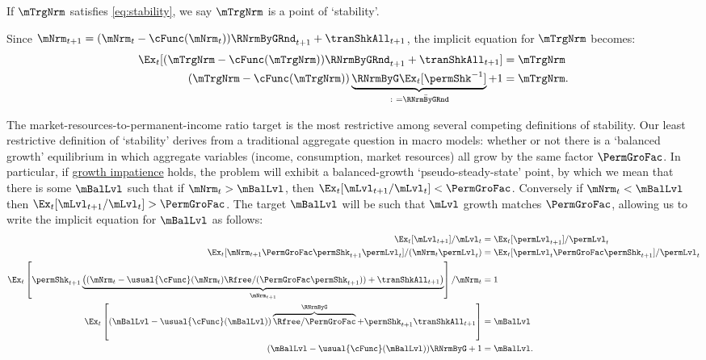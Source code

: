 \documentclass[BufferStockTheory]{subfiles}
\begin{document}
If $\mTrgNrm$ satisfies \eqref{eq:stability}, we say $\mTrgNrm$ is a point of `stability'.

\hypertarget{mTargImplicit}{}
Since $\mNrm_{t+1}= (\mNrm_{t}-\cFunc(\mNrm_{t}))\RNrmByGRnd_{t+1}  +\tranShkAll_{t+1}$, the implicit equation for $\mTrgNrm$ becomes:
%
\begin{equation} \label{eq:mTargImplicit}
  \begin{aligned}
    \Ex_{t} [(\mTrgNrm-\cFunc(\mTrgNrm))\RNrmByGRnd_{t+1}+\tranShkAll_{t+1}] & = \mTrgNrm     \\   (\mTrgNrm-\cFunc(\mTrgNrm))\underbrace{\RNrmByG\Ex_{t}[\permShk^{-1}]}_{\colon = \bar{\RNrmByGRnd}}+1 & = \mTrgNrm .
  \end{aligned}
\end{equation}

\hypertarget{Collective-Stability}{}
\hypertarget{pseudo-steady-state}{}

The market-resources-to-permanent-income ratio target is the most restrictive among several competing definitions of stability.
Our least restrictive definition of `stability' derives from a traditional aggregate question in macro models: whether or not there is a `balanced growth' equilibrium in which aggregate variables (income, consumption, market resources) all grow by the same factor $\PermGroFac$.
In particular, if \hyperlink{GIC}{growth impatience} holds, the problem will exhibit a balanced-growth `pseudo-steady-state' point, by which we mean that there is some ${\mBalLvl}$ such that if $\mNrm_{t}>{\mBalLvl}$, then $\Ex_{t}[\mLvl_{t+1}/\mLvl_{t}] < \PermGroFac$.\hypertarget{balgrostable}{}
\hypertarget{balgrostableSolve}{}
Conversely if $\mNrm_{t}<{\mBalLvl}$ then $\Ex_{t}[\mLvl_{t+1}/\mLvl_{t}] > \PermGroFac$.
The target $\mBalLvl$ will be such that $\mLvl$ growth matches $\PermGroFac$, allowing us to write the implicit equation for $\mBalLvl$ as follows:
%
\begin{equation}\label{eq:balgrostable}
  \begin{aligned}
    \Ex_{t}[\mLvl_{t+1}]/\mLvl_{t} & =\Ex_{t}[\permLvl_{t+1}]/\permLvl_{t}
    \\  \Ex_{t}[\mNrm_{t+1}\PermGroFac\permShk_{t+1}\permLvl_{t}]/(\mNrm_{t}\permLvl_{t}) & =\Ex_{t}[\permLvl_{t}\PermGroFac\permShk_{t+1}]/\permLvl_{t}
    \\ \Ex_{t}\left[\permShk_{t+1}\underbrace{\left((\mNrm_{t}-\usual{\cFunc}(\mNrm_{t})\Rfree/(\PermGroFac\permShk_{t+1}))+\tranShkAll_{t+1}\right)}_{\mNrm_{t+1}}\right]/\mNrm_{t} & = 1
    \\ 
    \Ex_{t}\left[(\mBalLvl-\usual{\cFunc}(\mBalLvl))\overbrace{\Rfree/\PermGroFac}^{\RNrmByG}+\permShk_{t+1}\tranShkAll_{t+1}\right] & = \mBalLvl
    \\  (\mBalLvl-\usual{\cFunc}(\mBalLvl))\RNrmByG + 1 & = \mBalLvl .
  \end{aligned}
\end{equation}
\end{document}

